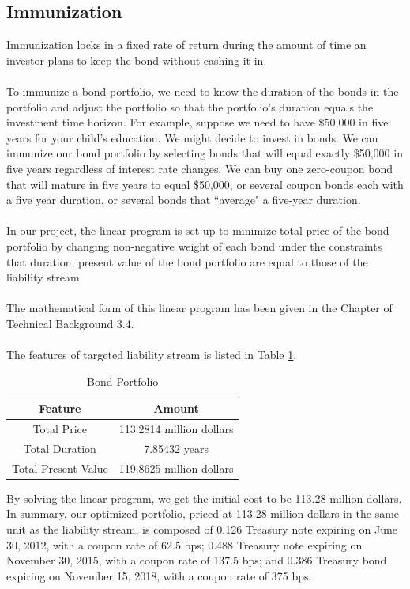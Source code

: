 \documentclass[oneside,12pt]{report}
\begin{document}
{\subsection{Immunization}
\vspace{8pt}

Immunization locks in a fixed rate of return during the amount of time an investor plans to keep the bond without cashing it in.\\
\\
To immunize a bond portfolio, we need to know the duration of the bonds in the portfolio and adjust the portfolio so that the portfolio's duration equals the investment time horizon. For example, suppose we need to have \$50,000 in five years for your child's education. We might decide to invest in bonds. We can immunize our bond portfolio by selecting bonds that will equal exactly \$50,000 in five years regardless of interest rate changes. We can buy one zero-coupon bond that will mature in five years to equal \$50,000, or several coupon bonds each with a five year duration, or several bonds that ``average" a five-year duration.\\
\\
In our project, the linear program is set up to minimize total price of the bond portfolio by changing non-negative weight of each bond under the constraints that duration, present value of the bond portfolio are equal to those of the liability stream.\\
\\
The mathematical form of this linear program has been given in the Chapter of Technical Background 3.4.\\
\\
The features of targeted liability stream is listed in Table \ref{tab:bp}.\\
\begin{table}[h]
\centering  
\begin{tabular}{|c|c|}
\hline
Feature  &Amount\\ \hline  
Total Price  &113.2814 million dollars\\
Total Duration  &7.85432 years\\ 
Total Present Value  &119.8625 million dollars\\ 
\hline
\end{tabular}
\caption{Bond Portfolio}
\label{tab:bp}
\end{table}

\noindent By solving the linear program, we get the initial cost to be 113.28 million dollars. In summary, our optimized portfolio, priced at 113.28 million dollars in the same unit as the liability stream, is composed of 0.126 Treasury note expiring on June 30, 2012, with a coupon rate of 62.5 bps; 0.488 Treasury note expiring on November 30, 2015, with a coupon rate of 137.5 bps; and 0.386 Treasury bond expiring on November 15, 2018, with a coupon rate of 375 bps. \\

}
\end{document}
